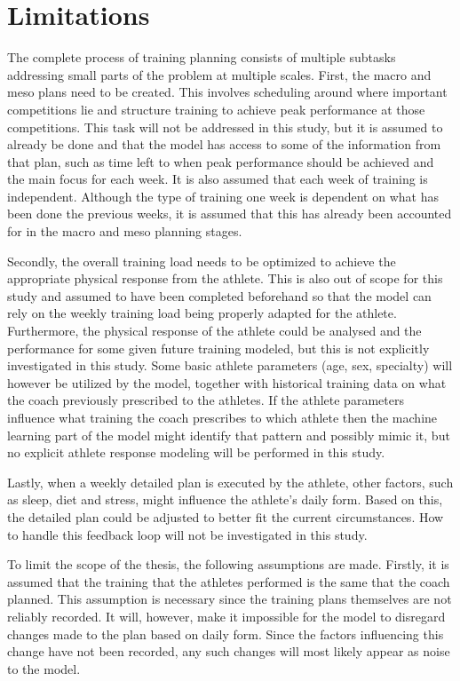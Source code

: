 \section{Limitations}
\label{sec:limitations}
The complete process of training planning consists of multiple subtasks addressing small parts of the problem at multiple scales.
First, the macro and meso plans need to be created. 
This involves scheduling around where important competitions lie and structure training to achieve peak performance at those competitions.
This task will not be addressed in this study, but it is assumed to already be done and that the model has access to some of the information from that plan, such as time left to when peak performance should be achieved and the main focus for each week.
It is also assumed that each week of training is independent.
Although the type of training one week is dependent on what has been done the previous weeks, it is assumed that this has already been accounted for in the macro and meso planning stages.

Secondly, the overall training load needs to be optimized to achieve the appropriate physical response from the athlete.
This is also out of scope for this study and assumed to have been completed beforehand so that the model can rely on the weekly training load being properly adapted for the athlete. 
Furthermore, the physical response of the athlete could be analysed and the performance for some given future training modeled, but this is not explicitly investigated in this study.
Some basic athlete parameters (age, sex, specialty) will however be utilized by the model, together with historical training data on what the coach previously prescribed to the athletes.
If the athlete parameters influence what training the coach prescribes to which athlete then the machine learning part of the model might identify that pattern and possibly mimic it, but no explicit athlete response modeling will be performed in this study.

Lastly, when a weekly detailed plan is executed by the athlete, other factors, such as sleep, diet and stress, might influence the athlete's daily form.
Based on this, the detailed plan could be adjusted to better fit the current circumstances.
How to handle this feedback loop will not be investigated in this study.

To limit the scope of the thesis, the following assumptions are made.
Firstly, it is assumed that the training that the athletes performed is the same that the coach planned.
This assumption is necessary since the training plans themselves are not reliably recorded.
It will, however, make it impossible for the model to disregard changes made to the plan based on daily form.
Since the factors influencing this change have not been recorded, any such changes will most likely appear as noise to the model.

